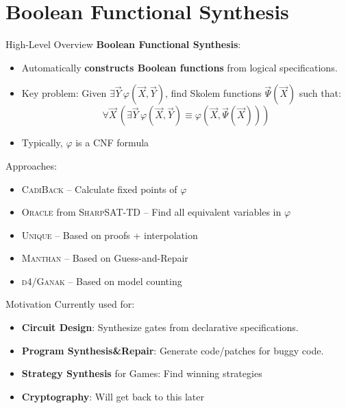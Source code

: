 \documentclass[aspectratio=169]{beamer}
\begin{document}
\section{Boolean Functional Synthesis}
\begin{frame}{High-Level Overview}
  \textbf{Boolean Functional Synthesis}:
  \begin{itemize}
    \item Automatically \textbf{constructs Boolean functions} from logical specifications.
    \item Key problem: Given \(\exists \vec{Y}\, \varphi(\vec{X}, \vec{Y})\),
        find Skolem functions \(\vec{\Psi}(\vec{X})\) such that:
        \[
            \forall \vec{X}\, \left( \exists \vec{Y}\, \varphi(\vec{X}, \vec{Y}) \equiv \varphi(\vec{X}, \vec{\Psi}(\vec{X})) \right)
        \]
    \item Typically, \(\varphi\) is a CNF formula
\end{itemize}
\bigskip

Approaches:
\begin{itemize}
    \item \textsc{CadiBack} -- Calculate fixed points of \(\varphi\)
    \item \textsc{Oracle} from \textsc{SharpSAT-TD} -- Find all equivalent variables in \(\varphi\)
    \item \textsc{Unique} -- Based on proofs + interpolation
    \item \textsc{Manthan} -- Based on Guess-and-Repair
    \item \textsc{d4/Ganak} -- Based on model counting
\end{itemize}
\bigskip
\end{frame}

\begin{frame}{Motivation}
Currently used for:
\begin{itemize}
    \item \textbf{Circuit Design}: Synthesize gates from declarative specifications.
    \item \textbf{Program Synthesis\&Repair}: Generate code/patches for buggy code.
    \item \textbf{Strategy Synthesis} for Games: Find winning strategies
    \item \textbf{Cryptography}: Will get back to this later
\end{itemize}
\end{frame}
\end{document}
